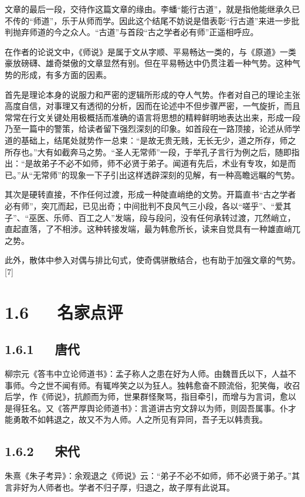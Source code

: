 \documentclass[letterpaper,10pt,english]{sphinxmanual}
\begin{document}
文章的最后一段，交待作这篇文章的缘由。李蟠“能行古道”，就是指他能继承久已不传的“师道”，乐于从师而学。因此这个结尾不妨说是借表彰“行古道”来进一步批判抛弃师道的今之众人。“古道”与首段“古之学者必有师”正遥相呼应。

在作者的论说文中，《师说》是属于文从字顺、平易畅达一类的，与《原道》一类豪放磅礴、雄奇桀傲的文章显然有别。但在平易畅达中仍贯注着一种气势。这种气势的形成，有多方面的因素。

首先是理论本身的说服力和严密的逻辑所形成的夺人气势。作者对自己的理论主张高度自信，对事理又有透彻的分析，因而在论述中不但步骤严密，一气旋折，而且常常在行文关键处用极概括而准确的语言将思想的精粹鲜明地表达出来，形成一段乃至一篇中的警策，给读者留下强烈深刻的印象。如首段在一路顶接，论述从师学道的基础上，结尾处就势作一总束：“是故无贵无贱，无长无少，道之所存，师之所存也。”大有如截奔马之势。“圣人无常师”一段，于举孔子言行为例之后，随即指出：“是故弟子不必不如师，师不必贤于弟子。闻道有先后，术业有专攻，如是而已。”从“无常师”的现象一下子引出这样透辟深刻的见解，有一种高瞻远瞩的气势。

其次是硬转直接，不作任何过渡，形成一种陡直峭绝的文势。开篇直书“古之学者必有师”，突兀而起，已见出奇；中间批判不良风气三小段，各以“嗟乎”、“爱其子”、“巫医、乐师、百工之人”发端，段与段问，没有任何承转过渡，兀然峭立，直起直落，了不相涉。这种转接发端，最为韩愈所长，读来自觉具有一种雄直峭兀之势。

此外，散体中参入对偶与排比句式，使奇偶骈散结合，也有助于加强文章的气势。{[}7{]}


\section{1.6   名家点评}
\label{\detokenize{p01_u6563_u6587/_u97e9_u6108-_u5e08_u8bf4:id8}}

\subsection{1.6.1   唐代}
\label{\detokenize{p01_u6563_u6587/_u97e9_u6108-_u5e08_u8bf4:id9}}
柳宗元《答韦中立论师道书》：孟子称人之患在好为人师。由魏晋氏以下，人益不事师。今之世不闻有师。有辄哗笑之以为狂人。独韩愈奋不顾流俗，犯笑侮，收召后学，作《师说》，抗颜而为师，世果群怪聚骂，指目牵引，而增与为言词，愈以是得狂名。又《答严厚舆论师道书》：言道讲古穷文辞以为师，则固吾属事。仆才能勇敢不如韩退之，故又不为人师。人之所见有异同，吾子无以韩责我。


\subsection{1.6.2   宋代}
\label{\detokenize{p01_u6563_u6587/_u97e9_u6108-_u5e08_u8bf4:id10}}
朱熹《朱子考异》：余观退之《师说》云：“弟子不必不如师，师不必贤于弟子。”其言非好为人师者也。学者不归子厚，归退之，故子厚有此说耳。
\end{document}
